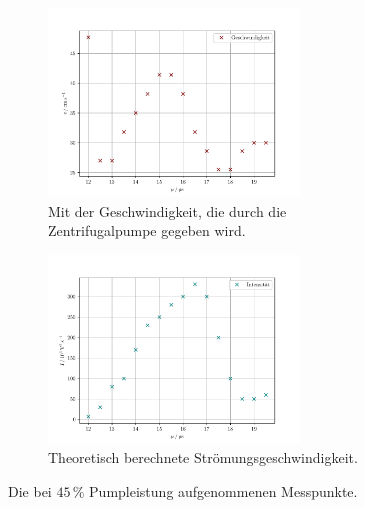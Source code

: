 \begin{figure}
    \centering
    \begin{subfigure}{0.48\textwidth}
        \centering
        \includegraphics[height=5.0cm]{plots/45velocity.pdf}
        \caption{Mit der Geschwindigkeit, die durch die Zentrifugalpumpe gegeben wird.}
        \label{fig:45velo}
    \end{subfigure}
    \begin{subfigure}{0.48\textwidth}
        \centering
        \includegraphics[height=5.0cm]{plots/45intensity.pdf}
        \caption{Theoretisch berechnete Strömungsgeschwindigkeit.}
        \label{fig:45inten}
    \end{subfigure}
    \caption{Die bei $45\,\%$ Pumpleistung aufgenommenen Messpunkte.}
    \label{fig:45vi}
\end{figure}

